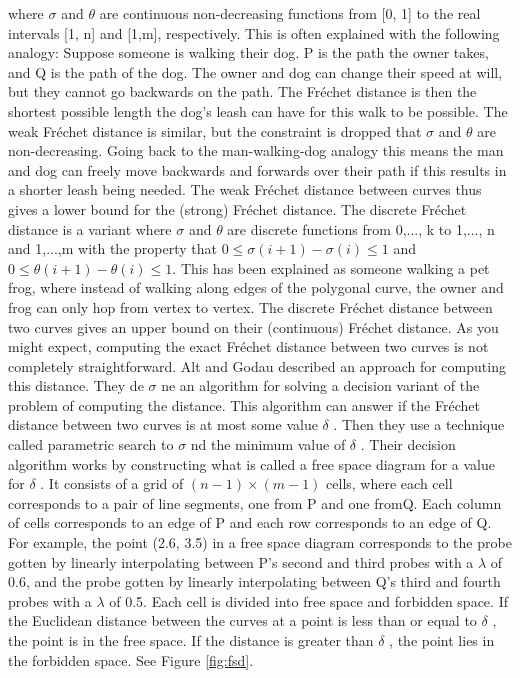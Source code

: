 \documentclass[twoside,12pt, a4paper]{report}
\begin{document}
where  $ \sigma $   and $ \theta  $  are continuous non-decreasing functions from [0, 1] to the real intervals [1, n] and [1,m], respectively.
This is often explained with the following analogy: Suppose someone is walking
their dog. P is the path the owner takes, and Q is the path of the dog. The owner
and dog can change their speed at will, but they cannot go backwards on the path.
The Fréchet distance is then the shortest possible length the dog’s leash can have
for this walk to be possible.
The weak Fréchet distance is similar, but the constraint is dropped that  $ \sigma $    and $ \theta $  
are non-decreasing. Going back to the man-walking-dog analogy this means the
man and dog can freely move backwards and forwards over their path if this results
in a shorter leash being needed. The weak Fréchet distance between curves thus
gives a lower bound for the (strong) Fréchet distance.
The discrete Fréchet distance is a variant where  $ \sigma $    and $ \theta $   are discrete functions
from {0,..., k} to {1,..., n} and {1,...,m} with the property that 
$0 \leq \sigma (i+1)-\sigma    (i) \leq 1$
and $0 \leq  \theta   (i + 1)-\theta   (i) \leq 1$. This has been explained as someone walking a pet frog,
where instead of walking along edges of the polygonal curve, the owner and frog can
only hop from vertex to vertex. The discrete Fréchet distance between two curves
gives an upper bound on their (continuous) Fréchet distance.
As you might expect, computing the exact Fréchet distance between two curves
is not completely straightforward. Alt and Godau \cite{AltGodau} described an approach for
computing this distance. They de $ \sigma $   ne an algorithm for solving a decision variant of
the problem of computing the distance. This algorithm can answer if the Fréchet
distance between two curves is at most some value $ \delta $ . Then they use a technique
called parametric search to  $ \sigma $   nd the minimum value of $ \delta $ .
Their decision algorithm works by constructing what is called a free space diagram
for a value for $ \delta $ .
It consists of a grid of $   (n - 1)  \times  (m - 1)$ cells, where each cell corresponds to a pair
of line segments, one from P and one fromQ. Each column of cells corresponds to an
edge of P and each row corresponds to an edge of Q. For example, the point (2.6, 3.5)
in a free space diagram corresponds to the probe gotten by linearly interpolating
between P’s second and third probes with a $ \lambda $  of 0.6, and the probe gotten by linearly
interpolating between Q’s third and fourth probes with a $ \lambda $  of 0.5. Each cell is divided
into free space and forbidden space. If the Euclidean distance between the curves at a
point is less than or equal to $ \delta $ , the point is in the free space. If the distance is greater
than $ \delta $ , the point lies in the forbidden space. See Figure \ref{fig:fsd}.
\end{document}
